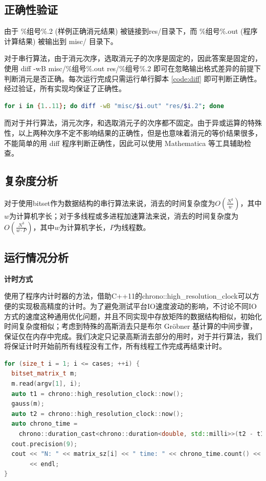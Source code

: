 \documentclass[a4paper]{article}
\begin{document}
\subsection{正确性验证}
由于 \%组号\%.2 (样例正确消元结果) 被链接到res/目录下，而 \%组号\%.out (程序计算结果) 被输出到 misc/ 目录下。

对于串行算法，由于消元次序，选取消元子的次序是固定的，因此答案是固定的，使用 diff -wB misc/\%组号\%.out res/\%组号\%.2 即可在忽略输出格式差异的前提下判断消元是否正确。每次运行完成只需运行单行脚本 \ref{code:diff} 即可判断正确性。经过验证，所有实现均保证了正确性。
\begin{lstlisting}[frame=trbl, language={bash}, caption={单行 Bash 脚本}, label = {code:diff}]
  for i in {1..11}; do diff -wB "misc/$i.out" "res/$i.2"; done
\end{lstlisting}

而对于并行算法，消元次序，和选取消元子的次序都不固定。由于异或运算的特殊性，以上两种次序不定不影响结果的正确性，但是也意味着消元的等价结果很多，不能简单的用 diff 程序判断正确性，因此可以使用 Mathematica 等工具辅助检查。

\subsection{复杂度分析}
对于使用bitset作为数据结构的串行算法来说，消去的时间复杂度为$O(\frac{N^3}{w})$，其中$w$为计算机字长；对于多线程或多进程加速算法来说，消去的时间复杂度为$O(\frac{N^3}{w \cdot P})$，其中$w$为计算机字长，$P$为线程数。

\subsection{运行情况分析}
\textbf{计时方式}

使用了程序内计时器的方法，借助C++11的chrono::high\_resolution\_clock可以方便的实现极高精度的计时。为了避免测试平台IO速度波动的影响，不讨论不同IO方式的速度这种通用优化问题，并且不同实现中存放矩阵的数据结构相似，初始化时间复杂度相似；考虑到特殊的高斯消去只是布尔 Gröbner 基计算的中间步骤，保证仅在内存中完成。我们决定只记录高斯消去部分的用时，对于并行算法，我们将保证计时开始前所有线程没有工作，所有线程工作完成再结束计时。

\begin{lstlisting}[frame=trbl, language={C++}, caption={计时器参考代码}, label={code:chrono}]
for (size_t i = 1; i <= cases; ++i) {
  bitset_matrix_t m;
  m.read(argv[1], i);
  auto t1 = chrono::high_resolution_clock::now();
  gauss(m);
  auto t2 = chrono::high_resolution_clock::now();
  auto chrono_time =
    chrono::duration_cast<chrono::duration<double, std::milli>>(t2 - t1);
  cout.precision(9);
  cout << "N: " << matrix_sz[i] << " time: " << chrono_time.count() << " ms"
       << endl;
}
\end{lstlisting}
\end{document}
